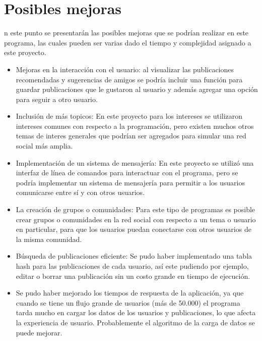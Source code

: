 \documentclass[9pt,letterpaper,onecolumn]{rho-class/rho}
\begin{document}
\section{Posibles mejoras}

n este punto se presentarán las posibles mejoras que se podrían realizar en este programa, las cuales pueden ser varias dado el tiempo y complejidad asignado a este proyecto.

\begin{itemize}
	\item Mejoras en la interacción con el usuario: al visualizar las publicaciones recomendadas y sugerencias de amigos se podría incluir una función para guardar publicaciones que le gustaron al usuario y además agregar una opción para seguir a otro usuario.
	\vspace{0.3cm}
	\item Inclusión de más topicos: En este proyecto para los intereses se utilizaron intereses comunes con respecto a la programación, pero existen muchos otros temas de interes generales que podrían ser agregados para simular una red social más amplia.
	\vspace{0.3cm}
	\item Implementación de un sistema de mensajería: En este proyecto se utilizó una interfaz de línea de comandos para interactuar con el programa, pero se podría implementar un sistema de mensajería para permitir a los usuarios comunicarse entre sí y con otros usuarios.
	\vspace{0.3cm}
	\item La creación de grupos o comunidades: Para este tipo de programas es posible crear grupos o comunidades en la red social con respecto a un tema o usuario en particular, para que los usuarios puedan conectarse con otros usuarios de la misma comunidad.
	\vspace{0.3cm}
	\item Búsqueda de publicaciones eficiente: Se pudo haber implementado una tabla hash para las publicaciones de cada usuario, así este pudiendo por ejemplo, editar o borrar una publicación sin un costo grande en tiempo de ejecución.
	\vspace{0.3cm}
	\item Se pudo haber mejorado los tiempos de respuesta de la aplicación, ya que cuando se tiene un flujo grande de usuarios (más de 50.000) el programa tarda mucho en cargar los datos de los usuarios y publicaciones, lo que afecta la experiencia de usuario. Probablemente el algoritmo de la carga de datos se puede mejorar.
\end{itemize}
\end{document}
